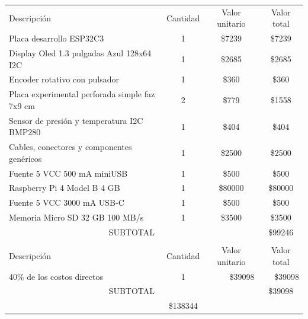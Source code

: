\documentclass[
11pt, %
]{charter}
\begin{document}
\begin{table}[htpb]
\centering
\begin{tabularx}{\linewidth}{@{}|X|c|r|r|@{}}
\hline
\rowcolor[HTML]{C0C0C0} 
\multicolumn{4}{|c|}{\cellcolor[HTML]{C0C0C0}COSTOS DIRECTOS} \\ \hline
\rowcolor[HTML]{C0C0C0} 
Descripción &
  \multicolumn{1}{c|}{\cellcolor[HTML]{C0C0C0}Cantidad} &
  \multicolumn{1}{c|}{\cellcolor[HTML]{C0C0C0}Valor unitario} &
  \multicolumn{1}{c|}{\cellcolor[HTML]{C0C0C0}Valor total} \\ \hline
Placa desarrollo ESP32C3 &
  \multicolumn{1}{c|}{1} &
  \multicolumn{1}{c|}{\$7239} &
  \multicolumn{1}{c|}{\$7239} \\ \hline
Display Oled 1.3 pulgadas Azul 128x64 I2C &
  \multicolumn{1}{c|}{1} &
  \multicolumn{1}{c|}{\$2685} &
  \multicolumn{1}{c|}{\$2685} \\ \hline
Encoder rotativo con pulsador &
  \multicolumn{1}{c|}{1} &
  \multicolumn{1}{c|}{\$360} &
  \multicolumn{1}{c|}{\$360} \\ \hline
Placa experimental perforada simple faz 7x9 cm &
  \multicolumn{1}{c|}{2} &
  \multicolumn{1}{c|}{\$779} &
  \multicolumn{1}{c|}{\$1558} \\ \hline
Sensor de presión y temperatura I2C BMP280 &
  \multicolumn{1}{c|}{1} &
  \multicolumn{1}{c|}{\$404} &
  \multicolumn{1}{c|}{\$404} \\ \hline
Cables, conectores y componentes genéricos &
  \multicolumn{1}{c|}{1} &
  \multicolumn{1}{c|}{\$2500} &
  \multicolumn{1}{c|}{\$2500} \\ \hline
Fuente 5 VCC 500 mA miniUSB &
  \multicolumn{1}{c|}{1} &
  \multicolumn{1}{c|}{\$500} &
  \multicolumn{1}{c|}{\$500} \\ \hline
Raspberry Pi 4 Model B 4 GB &
  \multicolumn{1}{c|}{1} &
  \multicolumn{1}{c|}{\$80000} &
  \multicolumn{1}{c|}{\$80000} \\ \hline
Fuente 5 VCC 3000 mA USB-C &
  \multicolumn{1}{c|}{1} &
  \multicolumn{1}{c|}{\$500} &
  \multicolumn{1}{c|}{\$500} \\ \hline
Memoria Micro SD 32 GB 100 MB/s &
  \multicolumn{1}{c|}{1} &
  \multicolumn{1}{c|}{\$3500} &
  \multicolumn{1}{c|}{\$3500} \\ \hline
    
\multicolumn{3}{|c|}{SUBTOTAL} &
  \multicolumn{1}{c|}{\$99246} \\ \hline
\rowcolor[HTML]{C0C0C0} 
\multicolumn{4}{|c|}{\cellcolor[HTML]{C0C0C0}COSTOS INDIRECTOS} \\ \hline
\rowcolor[HTML]{C0C0C0} 
Descripción &
	\multicolumn{1}{c|}{\cellcolor[HTML]{C0C0C0}Cantidad} &
	\multicolumn{1}{c|}{\cellcolor[HTML]{C0C0C0}Valor unitario} &
	\multicolumn{1}{c|}{\cellcolor[HTML]{C0C0C0}Valor total} \\ \hline
\multicolumn{1}{|l|}{40\% de los costos directos} & 1
   & \$39098
   & \$39098
   \\ \hline

\multicolumn{3}{|c|}{SUBTOTAL} &
  \multicolumn{1}{c|}{\$39098} \\ \hline
\rowcolor[HTML]{C0C0C0}
\multicolumn{3}{|c|}{TOTAL} & \$138344
   \\ \hline
\end{tabularx}%
\end{table}
\end{document}
